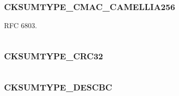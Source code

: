 \documentclass[letterpaper,10pt,english]{sphinxmanual}
\begin{document}
\subsubsection{CKSUMTYPE\_CMAC\_CAMELLIA256}
\label{appdev/refs/macros/CKSUMTYPE_CMAC_CAMELLIA256::doc}\label{appdev/refs/macros/CKSUMTYPE_CMAC_CAMELLIA256:cksumtype-cmac-camellia256}\label{appdev/refs/macros/CKSUMTYPE_CMAC_CAMELLIA256:cksumtype-cmac-camellia256-data}

\begin{fulllineitems}
\label{appdev/refs/macros/CKSUMTYPE_CMAC_CAMELLIA256:CKSUMTYPE_CMAC_CAMELLIA256}
\end{fulllineitems}


RFC 6803.

\begin{tabulary}{\linewidth}{|L|L|}
\hline

 & 
\\\hline
\end{tabulary}



\subsubsection{CKSUMTYPE\_CRC32}
\label{appdev/refs/macros/CKSUMTYPE_CRC32:cksumtype-crc32-data}\label{appdev/refs/macros/CKSUMTYPE_CRC32::doc}\label{appdev/refs/macros/CKSUMTYPE_CRC32:cksumtype-crc32}

\begin{fulllineitems}
\label{appdev/refs/macros/CKSUMTYPE_CRC32:CKSUMTYPE_CRC32}
\end{fulllineitems}


\begin{tabulary}{\linewidth}{|L|L|}
\hline

 & 
\\\hline
\end{tabulary}



\subsubsection{CKSUMTYPE\_DESCBC}
\label{appdev/refs/macros/CKSUMTYPE_DESCBC:cksumtype-descbc-data}\label{appdev/refs/macros/CKSUMTYPE_DESCBC::doc}\label{appdev/refs/macros/CKSUMTYPE_DESCBC:cksumtype-descbc}
\end{document}
